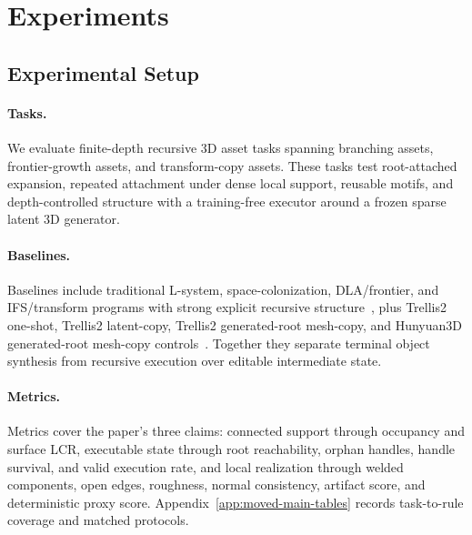 \documentclass[acmtog,anonymous,review]{acmart}
\begin{document}
\section{Experiments}

\subsection{Experimental Setup}
\paragraph{Tasks.}
We evaluate finite-depth recursive 3D asset tasks spanning branching assets, frontier-growth assets, and transform-copy assets. These tasks test root-attached expansion, repeated attachment under dense local support, reusable motifs, and depth-controlled structure with a training-free executor around a frozen sparse latent 3D generator.

\paragraph{Baselines.}
Baselines include traditional L-system, space-colonization, DLA/frontier, and IFS/transform programs with strong explicit recursive structure~\cite{lindenmayer1968lsystemsI,prusinkiewicz1990abop,runions2007spacecolonization,witten1981dla,sander2000dlaReview,hutchinson1981fractals,barnsley1988fractalsEverywhere}, plus Trellis2 one-shot, Trellis2 latent-copy, Trellis2 generated-root mesh-copy, and Hunyuan3D generated-root mesh-copy controls~\cite{trellis2025,trellis2project,hunyuan3d2025}. Together they separate terminal object synthesis from recursive execution over editable intermediate state.

\paragraph{Metrics.}
Metrics cover the paper's three claims: connected support through occupancy and surface LCR, executable state through root reachability, orphan handles, handle survival, and valid execution rate, and local realization through welded components, open edges, roughness, normal consistency, artifact score, and deterministic proxy score. Appendix~\ref{app:moved-main-tables} records task-to-rule coverage and matched protocols.
\end{document}
